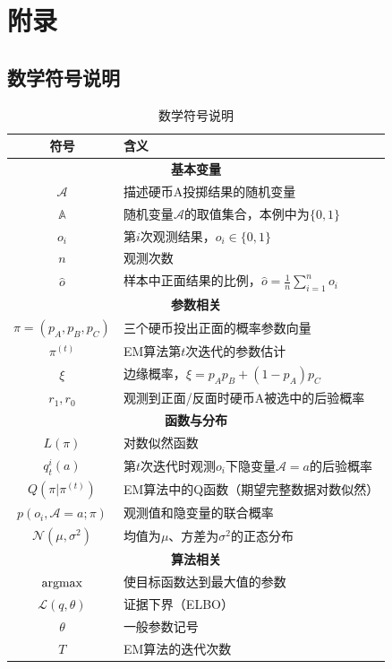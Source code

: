 
\newpage
\appendix

\section{附录}

\subsection{数学符号说明}
\begin{table}[h]
\centering
\caption{数学符号说明}
\label{tab:symbols}  %
\begin{tabular}{cl}
\hline
\textbf{符号} & \textbf{含义} \\
\hline
\multicolumn{2}{c}{\textbf{基本变量}} \\
\hline
$\mathcal{A}$ & 描述硬币A投掷结果的随机变量\\
$\mathbb{A}$ & 随机变量$\mathcal{A}$的取值集合，本例中为$\{0,1\}$  \\
$o_i$ & 第$i$次观测结果，$o_i \in \{0,1\}$ \\
$n$ & 观测次数 \\
$\hat{o}$ & 样本中正面结果的比例，$\hat{o} = \frac{1}{n}\sum_{i=1}^n o_i$ \\
\hline
\multicolumn{2}{c}{\textbf{参数相关}} \\
\hline
$\pi = (p_A, p_B, p_C)$ & 三个硬币投出正面的概率参数向量 \\
$\pi^{(t)}$ & EM算法第$t$次迭代的参数估计 \\
$\xi$ & 边缘概率，$\xi = p_A p_B + (1-p_A) p_C$ \\
$r_1, r_0$ & 观测到正面/反面时硬币A被选中的后验概率 \\
\hline
\multicolumn{2}{c}{\textbf{函数与分布}} \\
\hline
$L(\pi)$ & 对数似然函数 \\
$q_t^i(a)$ & 第$t$次迭代时观测$o_i$下隐变量$\mathcal{A}=a$的后验概率 \\
$Q(\pi|\pi^{(t)})$ & EM算法中的Q函数（期望完整数据对数似然） \\
$p(o_i, \mathcal{A}=a; \pi)$ & 观测值和隐变量的联合概率 \\
$\mathcal{N}(\mu, \sigma^2)$ & 均值为$\mu$、方差为$\sigma^2$的正态分布 \\
\hline
\multicolumn{2}{c}{\textbf{算法相关}} \\
\hline
$\operatorname*{argmax}$ & 使目标函数达到最大值的参数 \\
$\mathcal{L}(q,\theta)$ & 证据下界（ELBO） \\
$\theta$ & 一般参数记号 \\
$T$ & EM算法的迭代次数 \\
\hline
\end{tabular}
\end{table}


